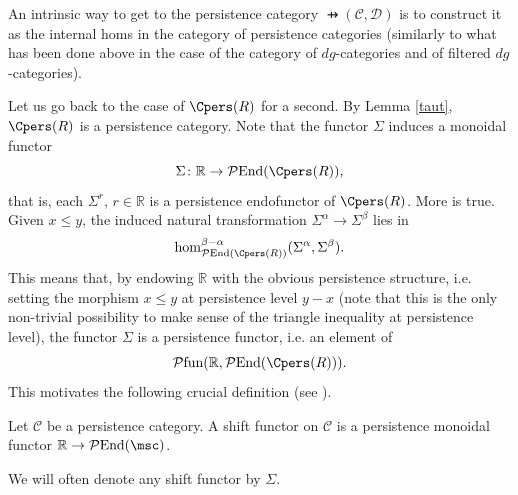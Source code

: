 \begin{remark}
    An intrinsic way to get to the persistence category $\pfun(\mathcal{C},\mathcal{D})$
    is to construct it as the internal homs in the category of persistence categories (similarly to what has been done above in the case of the category of $dg$-categories and of filtered $dg$-categories).
\end{remark}

Let us go back to the case of $\Cpers(R)$ for a second. By Lemma \ref{taut}, $\Cpers(R)$ is a persistence category. Note that the functor $\Sigma$ induces a monoidal functor $$\Sigma\colon \mathbb{R}\to \mathcal{P}\text{End}(\Cpers(R)),$$ that is, each $\Sigma^r$, $r\in \mathbb{R}$ is a persistence endofunctor of $\Cpers(R)$. More is true. Given $x\leq y$, the induced natural transformation $\Sigma^\alpha\to \Sigma^\beta$ lies in $$\hom_{\mathcal{P}\text{End}(\Cpers(R))}^{\beta-\alpha}(\Sigma^\alpha,\Sigma^\beta).$$ This means that, by endowing $\mathbb{R}$ with the obvious persistence structure, i.e. setting the morphism $x\leq y$ at persistence level $y-x$ (note that this is the only non-trivial possibility to make sense of the triangle inequality at persistence level), the functor $\Sigma$ is a persistence functor, i.e. an element of $$\mathcal{P}\text{fun}(\mathbb{R}, \mathcal{P}\text{End}(\Cpers(R))).$$
This motivates the following crucial definition (see \cite[Definition 2.15]{BCZ:tpc}).

\begin{dfn}
    Let $\mathcal{C}$ be a persistence category. A shift functor on $\mathcal{C}$ is a persistence monoidal functor $\mathbb{R}\to \mathcal{P}\text{End}(\msc)$.
\end{dfn}
\noindent We will often denote any shift functor by $\Sigma$.

